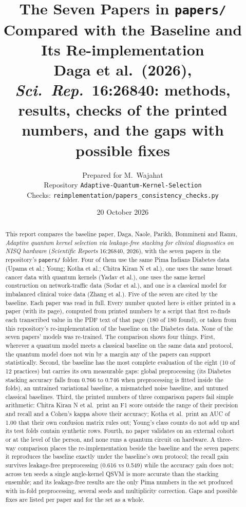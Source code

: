 \documentclass[11pt,a4paper]{article}
\title{The Seven Papers in \texttt{papers/} Compared with the Baseline and Its Re-implementation\\
\large Daga et al.\ (2026), \emph{Sci.\ Rep.}\ 16:26840: methods, results, checks of the printed numbers, and the gaps with possible fixes}
\author{Prepared for M.~Wajahat \\ \small Repository \texttt{Adaptive-Quantum-Kernel-Selection} \\ \small Checks: \texttt{reimplementation/papers\_consistency\_checks.py}}
\date{20 October 2026}
\begin{document}
\maketitle

\begin{abstract}
\noindent This report compares the baseline paper, Daga, Naole, Parikh, Bommineni and Ramu, \emph{Adaptive quantum kernel selection via leakage-free stacking for clinical diagnostics on NISQ hardware} (\emph{Scientific Reports} 16:26840, 2026), with the seven papers in the repository's \texttt{papers/} folder. Four of them use the same Pima Indians Diabetes data (Upama et al.; Young; Kotha et al.; Chitra Kiran N et al.), one uses the same breast cancer data with quantum kernels (Yadav et al.), one uses the same kernel construction on network-traffic data (Sodar et al.), and one is a classical model for imbalanced clinical voice data (Zhang et al.). Five of the seven are cited by the baseline. Each paper was read in full. Every number quoted here is either printed in a paper (with its page), computed from printed numbers by a script that first re-finds each transcribed value in the PDF text of that page (180 of 180 found), or taken from this repository's re-implementation of the baseline on the Diabetes data. None of the seven papers' models was re-trained. The comparison shows four things. First, wherever a quantum model meets a classical baseline on the same data and protocol, the quantum model does not win by a margin any of the papers can support statistically. Second, the baseline has the most complete evaluation of the eight (10 of 12 practices) but carries its own measurable gaps: global preprocessing (its Diabetes stacking accuracy falls from 0.766 to 0.746 when preprocessing is fitted inside the folds), an untrained variational baseline, a mismatched noise baseline, and untuned classical baselines. Third, the printed numbers of three comparison papers fail simple arithmetic: Chitra Kiran N et al.\ print an F1 score outside the range of their precision and recall and a Cohen's kappa above their accuracy; Kotha et al.\ print an AUC of 1.00 that their own confusion matrix rules out; Young's class counts do not add up and its test folds contain synthetic rows. Fourth, no paper validates on an external cohort or at the level of the person, and none runs a quantum circuit on hardware. A three-way comparison places the re-implementation beside the baseline and the seven papers: it reproduces the baseline exactly under the baseline's own protocol; the recall gain survives leakage-free preprocessing (0.616 vs 0.549) while the accuracy gain does not; across ten seeds a single angle-kernel QSVM is more accurate than the stacking ensemble; and its leakage-free results are the only Pima numbers in the set produced with in-fold preprocessing, several seeds and multiplicity correction. Gaps and possible fixes are listed per paper and for the set as a whole.
\end{abstract}
\end{document}

